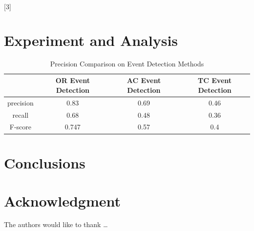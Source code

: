 \blindtext
{}[3]
\blinditemize
\blindenumerate

\blindmathtrue
\blindmathfalse
\blinddescription


\section{Experiment and Analysis} \label{sec-experiment}


\begin{table}  \centering
  \caption{Precision Comparison on Event Detection Methods}
  \label{tbl:overall-experiments}
  \begin{tabular}{cccc}
\toprule
    & OR Event Detection & AC Event Detection & TC Event Detection \\
\midrule
    precision & 0.83 & 0.69 & 0.46 \\
    recall & 0.68 & 0.48 & 0.36 \\
    F-score & 0.747 & 0.57 & 0.4 \\
\bottomrule
\end{tabular}
\end{table}


\section{Conclusions} \label{sec-conclusions}

\blindtext

\section*{Acknowledgment}

\lipsum[1]


The authors would like to thank \ldots

